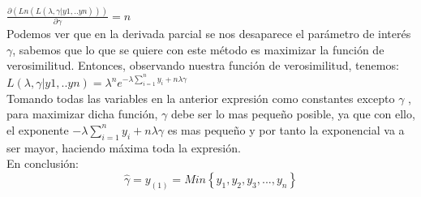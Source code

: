 \documentclass[letterpaper,12pt,onecolumn,titlepage]{article}
\begin{document}
~\\ $\frac{\partial(Ln(L(\lambda,\gamma |y1,..yn)))}{\partial\gamma}= n$
~\\ Podemos ver que en la derivada parcial se nos desaparece el par\'{a}metro de inter\'{e}s $\gamma$, sabemos que lo que se quiere con este m\'{e}todo es maximizar la funci\'{o}n de verosimilitud. Entonces, observando nuestra funci\'{o}n de verosimilitud, tenemos:
~\\ $L(\lambda,\gamma |y1,..yn)=\lambda^n e^{-\lambda\sum\limits_{i=1}^{n}{y_{i}}+n\lambda\gamma}$
~\\ Tomando todas las variables en la anterior expresi\'{o}n como constantes excepto $\gamma$ , para maximizar dicha funci\'{o}n, $\gamma$  debe ser lo mas peque\~{n}o posible, ya que con ello, el exponente $-\lambda\sum\limits_{i=1}^{n}{y_{i}}+n\lambda\gamma$ es mas peque\~{n}o y por tanto la exponencial va a ser mayor, haciendo m\'{a}xima toda la expresi\'{o}n.
~\\ En conclusi\'{o}n:
$$\hat{\gamma}=y_(1)= Min\left\lbrace{y_{1},y_{2},y_{3},...,y_{n}}\right\rbrace$$
 
\end{document}
